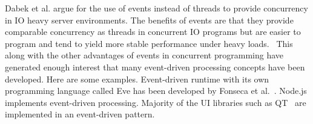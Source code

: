 Dabek et al. argue for the use of events instead of threads to provide concurrency in IO heavy server environments. The benefits of events are that they provide comparable concurrency as threads in concurrent IO programs but are easier to program and tend to yield more stable performance under heavy loads.~\cite{dabek2002event} This along with the other advantages of events in concurrent programming have generated enough interest that many event-driven processing concepts have been developed. Here are some examples. Event-driven runtime with its own programming language called Eve has been developed by Fonseca et al.~\cite{fonseca2014eve}. Node.js implements event-driven processing. Majority of the UI libraries such as QT~\cite{blanchette2006cpp} are implemented in an event-driven pattern.

